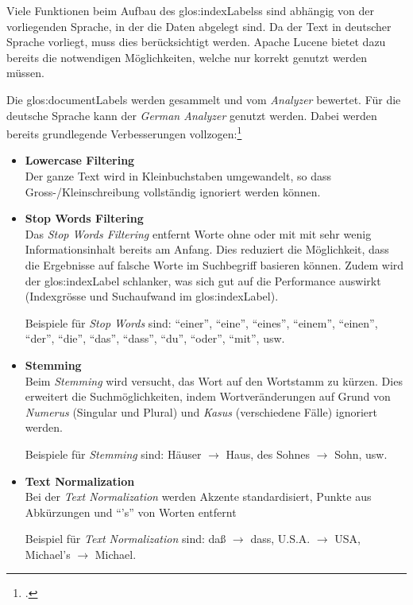 Viele Funktionen beim Aufbau des \glspl{glos:indexLabel}s sind abhängig von der vorliegenden Sprache, in der die Daten abgelegt sind.
Da der Text in deutscher Sprache vorliegt, muss dies berücksichtigt werden.
Apache Lucene bietet dazu bereits die notwendigen Möglichkeiten, welche nur korrekt genutzt werden müssen.

Die \glspl{glos:documentLabel} werden gesammelt und vom \textit{Analyzer} bewertet. Für die deutsche Sprache kann der \textit{German Analyzer} genutzt werden.
Dabei werden bereits grundlegende Verbesserungen vollzogen:\footcite{Inner_workings_of_the_German_Analyzer_in_Lucene_2016-05-08}
\begin{itemize}[noitemsep]
	\item \textbf{Lowercase Filtering}\\
	Der ganze Text wird in Kleinbuchstaben umgewandelt, so dass Gross-/Kleinschreibung vollständig ignoriert werden können.

	\item \textbf{Stop Words Filtering}\\
	Das \textit{Stop Words Filtering} entfernt Worte ohne oder mit mit sehr wenig Informationsinhalt bereits am Anfang.
	Dies reduziert die Möglichkeit, dass die Ergebnisse auf falsche Worte im Suchbegriff basieren können.
	Zudem wird der \gls{glos:indexLabel} schlanker, was sich gut auf die Performance auswirkt (Indexgrösse und Suchaufwand im \gls{glos:indexLabel}).

	Beispiele für \textit{Stop Words} sind:
	"`einer"', "`eine"', "`eines"', "`einem"', "`einen"', "`der"', "`die"', "`das"', "`dass"', "`du"', "`oder"', "`mit"', usw.

	\item \textbf{Stemming}\\
	Beim \textit{Stemming} wird versucht, das Wort auf den Wortstamm zu kürzen.
	Dies erweitert die Suchmöglichkeiten, indem Wortveränderungen auf Grund von \textit{Numerus} (Singular und Plural) und \textit{Kasus} (verschiedene Fälle) ignoriert werden.

	Beispiele für \textit{Stemming} sind:
	Häuser $\rightarrow$ Haus, des Sohnes $\rightarrow$ Sohn, usw.

	\item \textbf{Text Normalization}\\
	Bei der \textit{Text Normalization} werden Akzente standardisiert, Punkte aus Abkürzungen und "`'s"' von Worten entfernt

	Beispiel für \textit{Text Normalization} sind:
	daß $\rightarrow$ dass, U.S.A. $\rightarrow$ USA, Michael's $\rightarrow$ Michael.

\end{itemize}

